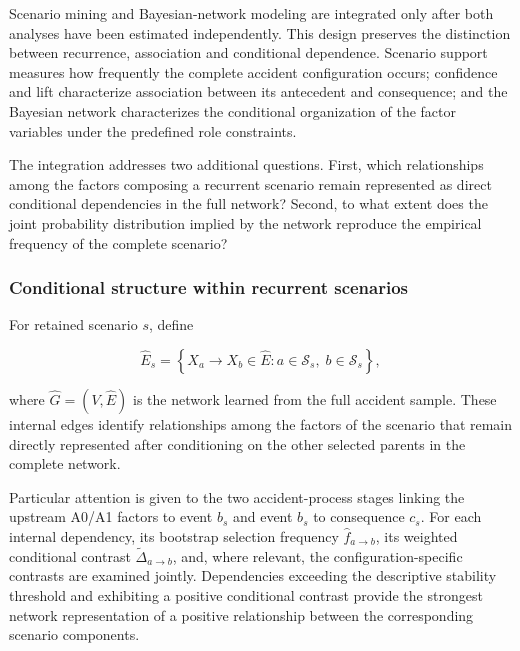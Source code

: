 Scenario mining and Bayesian-network modeling are integrated only after both
analyses have been estimated independently. This design preserves the
distinction between recurrence, association and conditional dependence.
Scenario support measures how frequently the complete accident configuration
occurs; confidence and lift characterize association between its antecedent
and consequence; and the Bayesian network characterizes the conditional
organization of the factor variables under the predefined role constraints.

The integration addresses two additional questions. First, which
relationships among the factors composing a recurrent scenario remain
represented as direct conditional dependencies in the full network? Second,
to what extent does the joint probability distribution implied by the network
reproduce the empirical frequency of the complete scenario?


\subsubsection{Conditional structure within recurrent scenarios}
\label{sec:chap4_scenario_internal_bn}

For retained scenario \(s\), define

\[
\widehat E_s
=
\left\{
X_a\rightarrow X_b\in\widehat E:
a\in\mathcal S_s,\;
b\in\mathcal S_s
\right\},
\]

where
\(\widehat G=(V,\widehat E)\)
is the network learned from the full accident sample. These internal edges
identify relationships among the factors of the scenario that remain directly
represented after conditioning on the other selected parents in the complete
network.

Particular attention is given to the two accident-process stages linking the
upstream A0/A1 factors to event \(b_s\) and event \(b_s\) to consequence
\(c_s\). For each internal dependency, its bootstrap selection frequency
\(\widehat f_{a\rightarrow b}\), its weighted conditional contrast
\(\widetilde{\Delta}_{a\rightarrow b}\), and, where relevant, the
configuration-specific contrasts are examined jointly. Dependencies exceeding
the descriptive stability threshold and exhibiting a positive conditional
contrast provide the strongest network representation of a positive
relationship between the corresponding scenario components.

